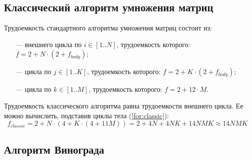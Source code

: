 \subsection{Классический алгоритм умножения матриц}

Трудоемкость стандартного алгоритма умножения матриц состоит из:

\begin{itemize}
	\item[---] внешнего цикла по $i \in [1..N]$, трудоемкость которого: $f = 2 + N \cdot (2 + f_{body})$;
	\item[---] цикла по $j \in [1..K]$, трудоемкость которого: $f = 2 + K \cdot (2 + f_{body})$;
	\item[---] цикла по $k \in [1..M]$, трудоемкость которого: $f = 2 + 12 \cdot M$.
\end{itemize}

Трудоемкость классического алгоритма равна трудоемкости внешнего цикла.
Ее можно вычислить, подставив циклы тела (\ref{for:classic}):
\begin{equation}
	\label{for:classic}
	f_{classic} = 2 + N \cdot (4 + K \cdot (4 + 11M)) = 2 + 4N + 4NK + 14NMK \approx 14NMK
\end{equation}

\subsection{Алгоритм Винограда}

